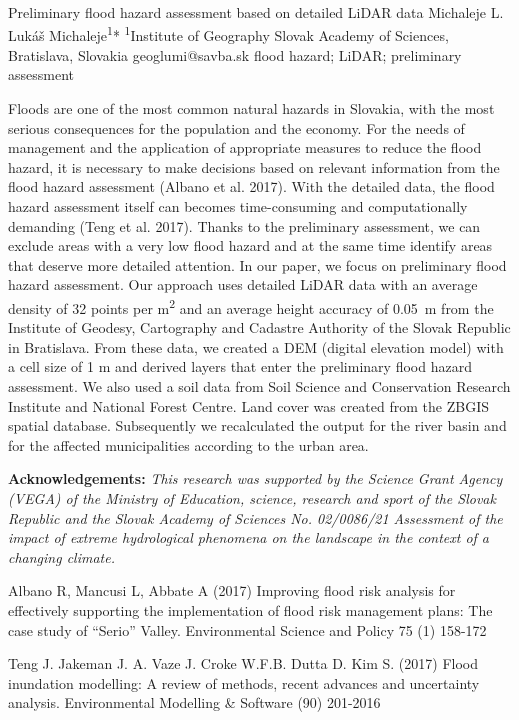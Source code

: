\abstract
{Preliminary flood hazard assessment based on detailed LiDAR data} 
{Michaleje L.} 
{Lukáš Michaleje\textsuperscript{1}*} 
{\TLtag} 
{
\textsuperscript{1}Institute of Geography Slovak Academy of Sciences, Bratislava, Slovakia
}
{geoglumi@savba.sk}  %
{flood hazard; LiDAR; preliminary assessment}
{
Floods are one of the most common natural hazards in Slovakia, with the most serious consequences for the population and the economy. For the needs of management and the application of appropriate measures to reduce the flood hazard, it is necessary to make decisions based on relevant information from the flood hazard assessment (Albano et al. 2017). With the detailed data, the flood hazard assessment itself can becomes time-consuming and computationally demanding (Teng et al. 2017). Thanks to the preliminary assessment, we can exclude areas with a very low flood hazard and at the same time identify areas that deserve more detailed attention.
In our paper, we focus on preliminary flood hazard assessment. Our approach uses detailed LiDAR data with an average density of 32 points per m\textsuperscript{2} and an average height accuracy of 0.05~m from the Institute of Geodesy, Cartography and Cadastre Authority of the Slovak Republic in Bratislava. From these data, we created a DEM (digital elevation model) with a cell size of 1 m and derived layers that enter the preliminary flood hazard assessment. We also used a soil data from Soil Science and Conservation Research Institute and National Forest Centre. Land cover was created from the ZBGIS spatial database. Subsequently we recalculated the output for the river basin and for the affected municipalities according to the urban area.

\vspace{0.5em}
\noindent
\textbf{Acknowledgements:}
\textit{This research was supported by the Science Grant Agency (VEGA) of the Ministry of Education, science, research and sport of the Slovak Republic and the Slovak Academy of Sciences No. 02/0086/21 Assessment of the impact of extreme hydrological phenomena on the landscape in the context of a changing climate.}
}
{Albano R, Mancusi L, Abbate A (2017) Improving flood risk analysis for effectively supporting the implementation of flood risk management plans: The case study of “Serio” Valley. Environmental Science and Policy 75 (1) 158-172 

Teng J. Jakeman J. A. Vaze J. Croke W.F.B. Dutta D. Kim S. (2017) Flood inundation modelling: A review of methods, recent advances and uncertainty analysis. Environmental Modelling \& Software (90) 201-2016 	
}

